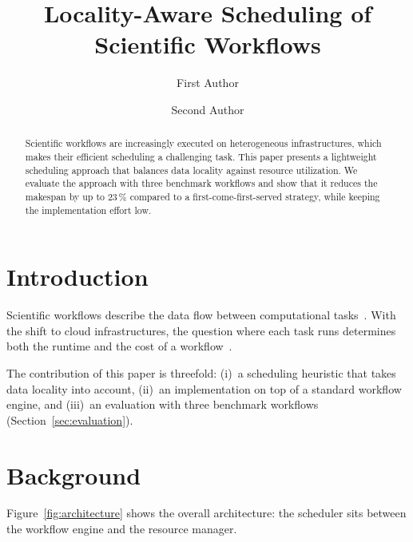 \title{Locality-Aware Scheduling of Scientific Workflows}
\author{First Author}
\author{Second Author}

\begin{abstract}
Scientific workflows are increasingly executed on heterogeneous infrastructures, which makes their efficient scheduling a challenging task.
This paper presents a lightweight scheduling approach that balances data locality against resource utilization.
We evaluate the approach with three benchmark workflows and show that it reduces the makespan by up to 23\,\% compared to a first-come-first-served strategy, while keeping the implementation effort low.
\end{abstract}


\maketitle

\section{Introduction}\label{sec:introduction}
Scientific workflows describe the data flow between computational tasks~\cite{Winery}.
With the shift to cloud infrastructures, the question where each task runs determines both the runtime and the cost of a workflow~\cite{Binz2009}.
\lipsum[1]

The contribution of this paper is threefold: (i)~a scheduling heuristic that takes data locality into account, (ii)~an implementation on top of a standard workflow engine, and (iii)~an evaluation with three benchmark workflows (Section~\ref{sec:evaluation}).
\lipsum[2-3]

\section{Background}\label{sec:background}
\lipsum[4]
Figure~\ref{fig:architecture} shows the overall architecture: the scheduler sits between the workflow engine and the resource manager.

